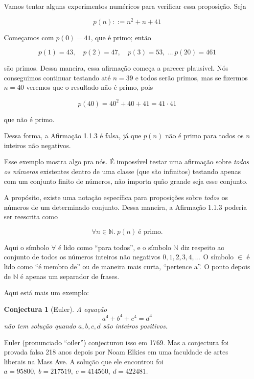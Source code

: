 \documentclass[12pt]{article}
\newtheorem{conjectura}[proposicao]{Conjectura}
\begin{document}
Vamos tentar alguns experimentos numéricos para verificar essa proposição. Seja

\begin{equation}
	p(n) ::= n^{2} + n + 41
\end{equation}

Começamos com $p(0) = 41$, que é primo; então

$$
	p(1) = 43,\quad p(2) = 47,\quad p(3) = 53,\ \dots\ p(20) = 461
$$

são primos. Dessa maneira, essa afirmação começa a parecer plausível. Nós
conseguimos continuar testando até $n = 39$ e todos serão primos, mas se
fizermos $n = 40$ veremos que o resultado não é primo, pois

$$
	p(40) = 40^{2} + 40 + 41 = 41 \cdot 41
$$

que não é primo.

Dessa forma, a Afirmação 1.1.3 é falsa, já que $p(n)$ não é primo para todos os
$n$ inteiros não negativos.

Esse exemplo mostra algo pra nós. É impossível testar uma afirmação sobre
\emph{todos os números} existentes dentro de uma classe (que são infinitos)
testando apenas com um conjunto finito de números, não importa quão grande seja
esse conjunto.

A propósito, existe uma notação específica para proposições sobre \emph{todos}
os números de um determinado conjunto. Dessa maneira, a Afirmação 1.1.3 poderia
ser reescrita como

\begin{equation}
	\forall n \in \mathbb{N}.\ p(n)\ \text{é primo.}
\end{equation}

Aqui o símbolo $\forall$ é lido como ``para todos'', e o símbolo $\mathbb{N}$
diz respeito ao conjunto de todos os números inteiros não negativos $0, 1, 2,
	3, 4, \dots$ O símbolo $\in$ é lido como ``é membro de'' ou de maneira mais
curta, ``pertence a''. O ponto depois de $\mathbb{N}$ é apenas um separador de
frases.

Aqui está mais um exemplo:

\begin{conjectura}[Euler]
	A equação
	$$a^4 + b^4 + c^4 = d^4$$
	não tem solução quando $a, b, c, d$ são inteiros positivos.
\end{conjectura}

Euler (pronunciado ``oiler'') conjecturou isso em 1769. Mas a conjectura foi
provada falsa 218 anos depois por Noam Elkies em uma faculdade de artes
liberais na Mass Ave. A solução que ele encontrou foi $a = 95800,\ b = 217519,\
	c = 414560,\ d = 422481$.
\end{document}
